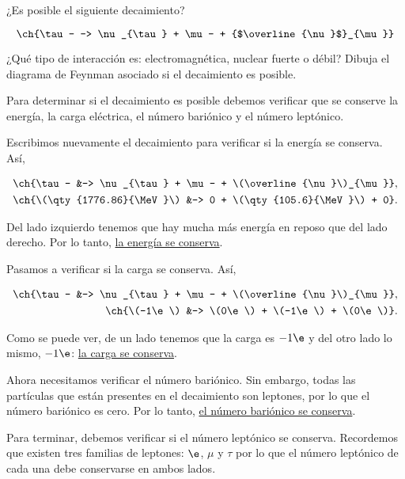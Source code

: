 \documentclass[./../main.tex]{subfiles}
\begin{document}
    \begin{exercise}
        ¿Es posible el siguiente decaimiento?

        \begin{equation*}
            \ch{\tau- -> \nu_{\tau} + \mu- + {$\overline{\nu}$}_{\mu}}
        \end{equation*}

        ¿Qué tipo de interacción es: electromagnética, nuclear fuerte o débil? Dibuja el diagrama de Feynman asociado si el decaimiento es posible.

        \begin{solution}
            Para determinar si el decaimiento es posible debemos verificar que se conserve la energía, la carga eléctrica, el número bariónico y el número leptónico.

            Escribimos nuevamente el decaimiento para verificar si la energía se conserva. Así,

            \begin{align*}
                \ch{\tau- &-> \nu_{\tau} + \mu- + \(\overline{\nu}\)_{\mu}},\\
                \ch{\(\qty{1776.86}{\MeV}\) &-> 0 + \(\qty{105.6}{\MeV}\) + 0}.
            \end{align*}

            Del lado izquierdo tenemos que hay mucha más energía en reposo que del lado derecho. Por lo tanto, \ul{la energía se conserva}.

            Pasamos a verificar si la carga se conserva. Así,

            \begin{align*}
                \ch{\tau- &-> \nu_{\tau} + \mu- + \(\overline{\nu}\)_{\mu}},\\
                \ch{\(-1\e\) &-> \(0\e\) + \(-1\e\) + \(0\e\)}.
            \end{align*}

            Como se puede ver, de un lado tenemos que la carga es \(-1\e\) y del otro lado lo mismo, \(-1\e\): \ul{la carga se conserva}.

            Ahora necesitamos verificar el número bariónico. Sin embargo, todas las partículas que están presentes en el decaimiento son leptones, por lo que el número bariónico es cero. Por lo tanto, \ul{el número bariónico se conserva}.

            Para terminar, debemos verificar si el número leptónico se conserva. Recordemos que existen tres familias de leptones: \(\e\), \(\mu\) y \(\tau\) por lo que el número leptónico de cada una debe conservarse en ambos lados.


\end{solution}
\end{exercise}
\end{document}

